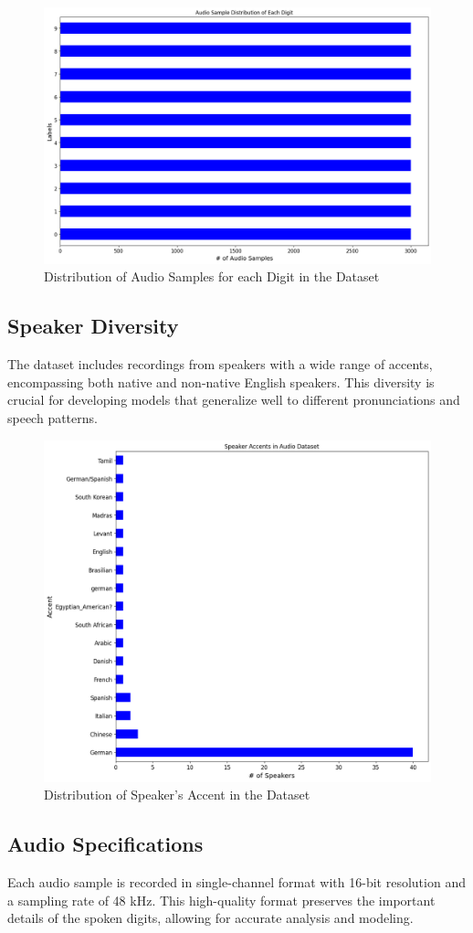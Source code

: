 \documentclass[12pt]{article}
\begin{document}
\begin{figure}[!h]
    \centering
    \includegraphics[width=0.6\linewidth]{figures/sample distribution.png}
    \caption{Distribution of Audio Samples for each Digit in the Dataset}
    \label{fig:enter-label}
\end{figure}



\subsection{Speaker Diversity}
The dataset includes recordings from speakers with a wide range of accents, encompassing both native and non-native English speakers. This diversity is crucial for developing models that generalize well to different pronunciations and speech patterns.

\begin{figure}[h!]
    \centering
    \includegraphics[width=0.6\linewidth]{figures/speaker diversity.png}
    \caption{Distribution of Speaker's Accent in the Dataset}
    \label{fig:enter-label}
\end{figure}

\subsection{Audio Specifications}
Each audio sample is recorded in single-channel format with 16-bit resolution and a sampling rate of 48 kHz. This high-quality format preserves the important details of the spoken digits, allowing for accurate analysis and modeling.
\end{document}
